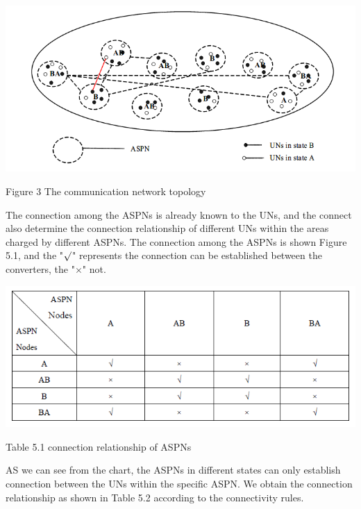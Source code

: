 \documentclass{article}
\begin{document}
\centerline{\includegraphics[width=.6\textwidth]{Figure3.png}}
\centerline{Figure 3 The communication network topology }


The connection among the ASPNs is already known to the UNs, and the connect also determine the
connection relationship of different UNs within the areas charged by different ASPNs. The connection
among the ASPNs is shown Figure 5.1, and the "\(\surd\)" represents the connection can be established
between the converters, the "\(\times\)" not.

\par
\centerline{\includegraphics[width=.5\textwidth]{Table1.png}}
\centerline{Table 5.1 connection relationship of ASPNs}

AS we can see from the chart, the ASPNs in different states can only establish connection between the
UNs within the specific ASPN. We obtain the connection relationship as shown in Table 5.2 according
to the connectivity rules.
\end{document}
